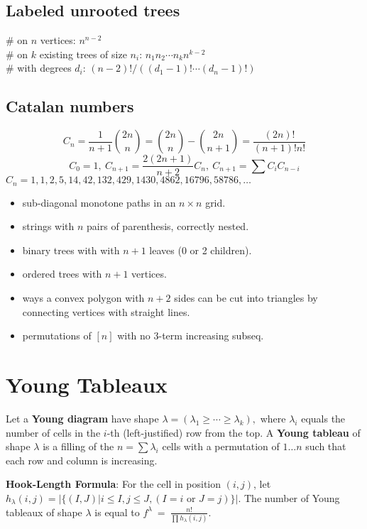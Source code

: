 	\subsection{Labeled unrooted trees}
		\# on $n$ vertices: $n^{n-2}$ \\
		\# on $k$ existing trees of size $n_i$: $n_1n_2\cdots n_k n^{k-2}$ \\
		\# with degrees $d_i$: $(n-2)! / ((d_1-1)! \cdots (d_n-1)!)$

	\subsection{Catalan numbers}
		\[ C_n=\frac{1}{n+1}\binom{2n}{n}= \binom{2n}{n}-\binom{2n}{n+1} = \frac{(2n)!}{(n+1)!n!} \]
		\[ C_0=1,\ C_{n+1} = \frac{2(2n+1)}{n+2}C_n,\ C_{n+1}=\sum C_iC_{n-i} \]
		${C_n = 1, 1, 2, 5, 14, 42, 132, 429, 1430, 4862, 16796, 58786, \dots}$
		\begin{itemize}[noitemsep]
			\item sub-diagonal monotone paths in an $n\times n$ grid.
			\item strings with $n$ pairs of parenthesis, correctly nested.
			\item binary trees with with $n+1$ leaves (0 or 2 children).
			\item ordered trees with $n+1$ vertices.
			\item ways a convex polygon with $n+2$ sides can be cut into triangles by connecting vertices with straight lines.
			\item permutations of $[n]$ with no 3-term increasing subseq.
		\end{itemize}

\section{Young Tableaux}

	Let a \textbf{Young diagram} have shape $\lambda=(\lambda_1\geq \cdots\geq \lambda_k),$ where $\lambda_i$ equals the number of cells in the $i$-th (left-justified) row from the top. A \textbf{Young tableau} of shape $\lambda$ is a filling of the $n=\sum \lambda_i$ cells with a permutation of $1\ldots n$ such that each row and  column is increasing.

	\textbf{Hook-Length Formula}: For the cell in position $(i,j)$, let $h_\lambda(i,j)=\left|\{(I,J)|i\le I, j\le J, (I=i\text{ or }J=j)\}\right|.$ The number of Young tableaux of shape $\lambda$ is equal to
$f^\lambda \ =\ \frac{n!}{\prod h_\lambda (i,j)}.$

